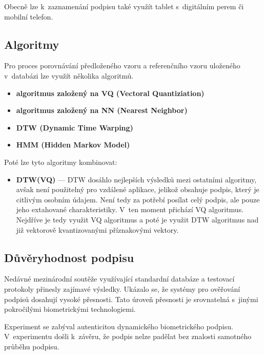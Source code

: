 Obecně lze k~zaznamenání podpisu také využít tablet s~digitálním perem či mobilní telefon.

\subsection*{Algoritmy}
Pro proces porovnávání předloženého vzoru a referenčního vzoru uloženého v~databázi lze využít několika algoritmů.

\begin{itemize}
  \item \textbf{algoritmus založený na VQ (Vectoral Quantiziation)}
  \item \textbf{algoritmus založený na NN (Nearest Neighbor)}
  \item \textbf{DTW (Dynamic Time Warping)}
  \item \textbf{HMM (Hidden Markov Model)}
\end{itemize}
\noindent
Poté lze tyto algoritmy kombinovat:
\begin{itemize}
  \item \textbf{DTW(VQ)} --- DTW dosáhlo nejlepších výsledků mezi ostatními algoritmy, avšak není použitelný pro vzdálené aplikace, jelikož obsahuje podpis, který je citlivým osobním údajem.
  Není tedy za potřebí posílat celý podpis, ale pouze jeho extahované charakteristiky.
  V~ten moment přichází VQ algoritmus. Nejdříve je tedy využit VQ algoritmus a poté je využit DTW algoritmus nad již vektorově kvantizovanými příznakovými vektory.~\cite{Jain2006}
\end{itemize}

\subsection*{Důvěryhodnost podpisu}
Nedávné mezinárodní soutěže využívající standardní databáze a testovací protokoly přinesly zajímavé výsledky.   %
Ukázalo se, že systémy pro ověřování podpisů dosahují vysoké přesnosti.                                         %
Tato úroveň přesnosti je srovnatelná s~jinými pokročilými biometrickými technologiemi.~\cite{Impedovo2008}      %

Experiment se zabýval autenticitou dynamického biometrického podpisu.
V~experimentu došli k~závěru, že podpis nelze padělat bez znalosti samotného průběhu podpisu.~\cite{6986974} %

